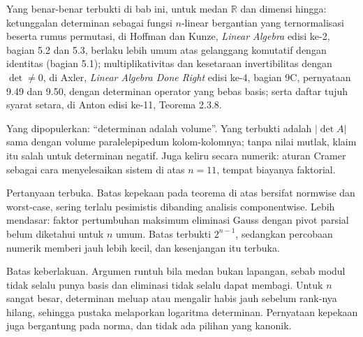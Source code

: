 \begin{untukpeneliti}
Yang benar-benar terbukti di bab ini, untuk medan $\mathbb{R}$ dan dimensi hingga: ketunggalan
determinan sebagai fungsi $n$-linear bergantian yang ternormalisasi beserta rumus permutasi,
di Hoffman dan Kunze, \emph{Linear Algebra} edisi ke-2, bagian 5.2 dan 5.3, berlaku lebih umum
atas gelanggang komutatif dengan identitas (bagian 5.1); multiplikativitas dan kesetaraan
invertibilitas dengan $\det\neq0$, di Axler, \emph{Linear Algebra Done Right} edisi ke-4,
bagian 9C, pernyataan 9.49 dan 9.50, dengan determinan operator yang bebas basis; serta daftar
tujuh syarat setara, di Anton edisi ke-11, Teorema 2.3.8.

Yang dipopulerkan: ``determinan adalah volume''. Yang terbukti adalah $|\det A|$ sama dengan
volume paralelepipedum kolom-kolomnya; tanpa nilai mutlak, klaim itu salah untuk determinan
negatif. Juga keliru secara numerik: aturan Cramer sebagai cara menyelesaikan sistem di atas
$n=11$, tempat biayanya faktorial.

Pertanyaan terbuka. Batas kepekaan pada teorema di atas bersifat normwise dan worst-case,
sering terlalu pesimistis dibanding analisis componentwise. Lebih mendasar: faktor pertumbuhan
maksimum eliminasi Gauss dengan pivot parsial belum diketahui untuk $n$ umum. Batas terbukti
$2^{n-1}$, sedangkan percobaan numerik memberi jauh lebih kecil, dan kesenjangan itu terbuka.

Batas keberlakuan. Argumen runtuh bila medan bukan lapangan, sebab modul tidak selalu punya
basis dan eliminasi tidak selalu dapat membagi. Untuk $n$ sangat besar, determinan meluap
atau mengalir habis jauh sebelum rank-nya hilang, sehingga pustaka melaporkan logaritma
determinan. Pernyataan kepekaan juga bergantung pada norma, dan tidak ada pilihan yang
kanonik.
\end{untukpeneliti}

